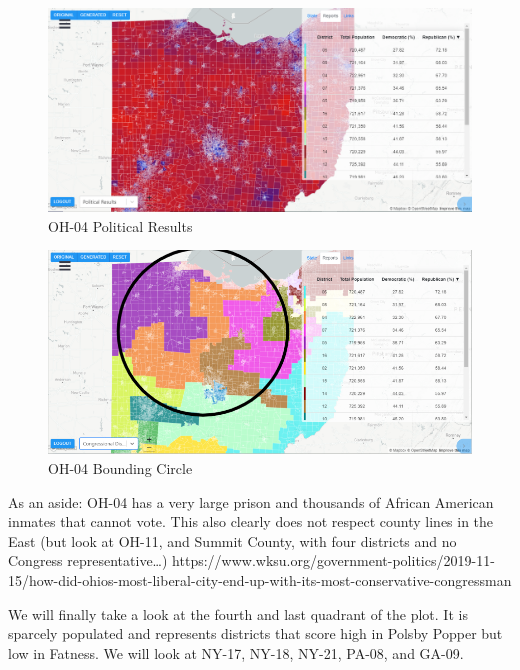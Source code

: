 \documentclass[letterpaper]{article}
\begin{document}
\begin{figure}[H]
	\includegraphics[width=\linewidth]{./figures/OH-04-SurroundingArea.png}
	\caption{OH-04 Political Results}
	\label{fig:oh04political}
\end{figure}

\begin{figure}[H]
	\includegraphics[width=\linewidth]{./figures/OH-04-BoundingCircle.png}
	\caption{OH-04 Bounding Circle}
	\label{fig:oh04boundingCircle}
\end{figure}


As an aside: OH-04 has a very large prison and thousands of African American inmates that cannot vote. This also clearly does not respect county lines in the East (but look at OH-11, and Summit County, with four districts and no Congress representative…)
https://www.wksu.org/government-politics/2019-11-15/how-did-ohios-most-liberal-city-end-up-with-its-most-conservative-congressman

We will finally take a look at the fourth and last quadrant of the plot. It is sparcely populated and represents districts that score high in Polsby Popper but low in Fatness. We will look at NY-17, NY-18, NY-21, PA-08, and GA-09.
\end{document}
